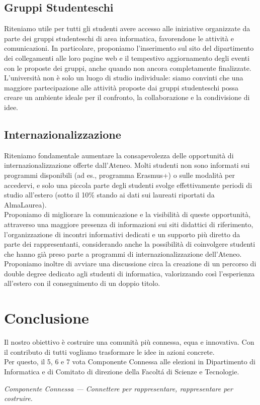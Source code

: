 \documentclass[12pt,a4paper]{article}
\begin{document}
\subsection{Gruppi Studenteschi}
Riteniamo utile per tutti gli studenti avere accesso alle iniziative organizzate da parte dei gruppi studenteschi di area informatica, favorendone le attività e comunicazioni.
In particolare, proponiamo l'inserimento sul sito del dipartimento dei collegamenti alle loro pagine web e il tempestivo aggiornamento degli eventi con le proposte dei gruppi, anche quando non ancora completamente finalizzate.
\\L'università non è solo un luogo di studio individuale: siamo convinti che una maggiore partecipazione alle attività proposte dai gruppi studenteschi possa creare un ambiente ideale per il confronto, la collaborazione e la condivisione di idee.

\subsection{Internazionalizzazione}
Riteniamo fondamentale aumentare la consapevolezza delle opportunità di internazionalizzazione offerte dall'Ateneo. Molti studenti non sono informati sui programmi disponibili (ad es., programma Erasmus+) o sulle modalità per accedervi, e solo una piccola parte degli studenti svolge effettivamente periodi di studio all'estero (sotto il 10\% stando ai dati sui laureati riportati da AlmaLaurea). %
\\Proponiamo di migliorare la comunicazione e la visibilità di queste opportunità, attraverso una maggiore presenza di informazioni sui siti didattici di riferimento, l'organizzazione di incontri informativi dedicati e un supporto più diretto da parte dei rappresentanti, considerando anche la possibilità di coinvolgere studenti che hanno già preso parte a programmi di internazionalizzazione dell'Ateneo.
\\ Proponiamo inoltre di avviare una discussione circa la creazione di un percorso di double degree dedicato agli studenti di informatica, valorizzando così l'esperienza all'estero con il conseguimento di un doppio titolo.

\section*{Conclusione}
Il nostro obiettivo è costruire una comunità più connessa, equa e innovativa. Con il contributo di tutti vogliamo trasformare le idee in azioni concrete.
\\Per questo, il 5, 6 e 7 vota Componente Connessa alle elezioni in Dipartimento di Informatica e di Comitato di direzione della Facoltá di Scienze e Tecnologie.
\vfill

\noindent
\textit{Componente Connessa --- Connettere per rappresentare, rappresentare per costruire.}
\end{document}
